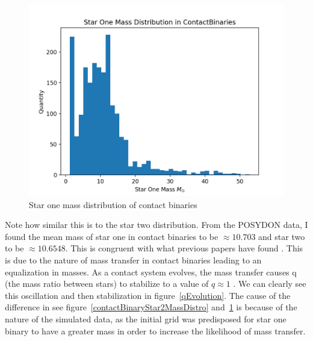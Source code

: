 \documentclass[12pt, a4paper]{article}
\begin{document}
        \begin{figure}[H]
            \centering
            \includegraphics[width = .8\textwidth]{figs/GeneratedFigs/W_UMa/ContactBinaries_Star_One_Mass_Distribution.png}
            \caption{Star one mass distribution of contact binaries}
            \label{contactBinarStar1MassDistro}
        \end{figure}

        Note how similar this is to the star two distribution. From the POSYDON data, I found the mean mass of star one in contact binaries to be $\approx 10.703$ and star two to be $\approx 10.6548$. This is congruent with what previous papers have found \parencite{Fabry_2025}. This is due to the nature of mass transfer in contact binaries leading to an equalization in masses. As a contact system evolves, the mass transfer causes q (the mass ratio between stars) to stabilize to a value of $q\approx1$ \parencite{Fabry_2025}. We can clearly see this oscillation and then stabilization in figure~\ref{qEvolution}. The cause of the difference in see figure~\ref{contactBinaryStar2MassDistro} and~\ref{contactBinarStar1MassDistro} is because of the nature of the simulated data, as the initial grid was predisposed for star one binary to have a greater mass in order to increase the likelihood of mass transfer. 
\end{document}

